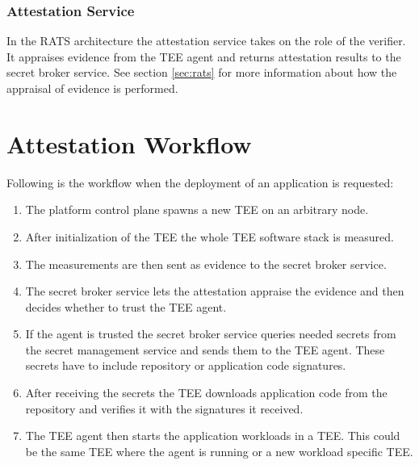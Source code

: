 \subsubsection{Attestation Service}

In the RATS architecture the attestation service takes on the role of the
verifier. It appraises evidence from the TEE agent and returns attestation
results to the secret broker service. See section \ref{sec:rats} for more
information about how the appraisal of evidence is performed.

\section{Attestation Workflow}
\label{sec:proposal:attestation-workflow}

Following is the workflow when the deployment of an application is requested:

\begin{enumerate}
  \item The platform control plane spawns a new TEE on an arbitrary node.
  \item After initialization of the TEE the whole TEE software stack is
        measured.
  \item The measurements are then sent as evidence to the secret broker service.
  \item The secret broker service lets the attestation appraise the evidence and
        then decides whether to trust the TEE agent.
  \item If the agent is trusted the secret broker service queries needed secrets
        from the secret management service and sends them to the TEE agent.
        These secrets have to include repository or application code signatures.
  \item After receiving the secrets the TEE downloads application code from the
        repository and verifies it with the signatures it received.
  \item The TEE agent then starts the application workloads in a TEE. This could
        be the same TEE where the agent is running or a new workload specific
        TEE.
\end{enumerate}
